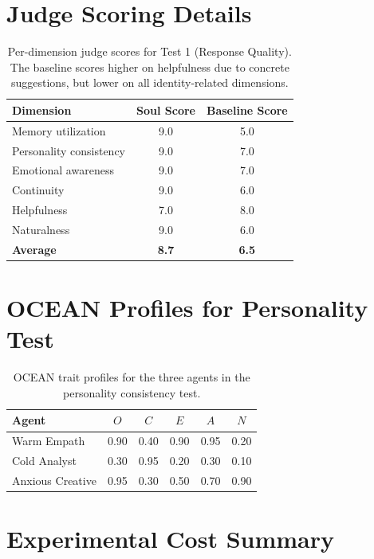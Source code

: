 \documentclass{article}
\begin{document}
\section{Judge Scoring Details}
\label{app:judge-scores}

\begin{table}[h]
\centering
\small
\begin{tabular}{@{}lcc@{}}
\toprule
\textbf{Dimension} & \textbf{Soul Score} & \textbf{Baseline Score} \\
\midrule
Memory utilization      & 9.0 & 5.0 \\
Personality consistency & 9.0 & 7.0 \\
Emotional awareness     & 9.0 & 7.0 \\
Continuity              & 9.0 & 6.0 \\
Helpfulness             & 7.0 & 8.0 \\
Naturalness             & 9.0 & 6.0 \\
\midrule
\textbf{Average}        & \textbf{8.7} & \textbf{6.5} \\
\bottomrule
\end{tabular}
\caption{Per-dimension judge scores for Test 1 (Response Quality). The baseline scores higher on helpfulness due to concrete suggestions, but lower on all identity-related dimensions.}
\label{tab:judge-detail}
\end{table}


\section{OCEAN Profiles for Personality Test}
\label{app:ocean-profiles}

\begin{table}[h]
\centering
\small
\begin{tabular}{@{}lccccc@{}}
\toprule
\textbf{Agent} & $O$ & $C$ & $E$ & $A$ & $N$ \\
\midrule
Warm Empath     & 0.90 & 0.40 & 0.90 & 0.95 & 0.20 \\
Cold Analyst    & 0.30 & 0.95 & 0.20 & 0.30 & 0.10 \\
Anxious Creative & 0.95 & 0.30 & 0.50 & 0.70 & 0.90 \\
\bottomrule
\end{tabular}
\caption{OCEAN trait profiles for the three agents in the personality consistency test.}
\label{tab:ocean-profiles}
\end{table}


\section{Experimental Cost Summary}
\label{app:costs}
\end{document}
